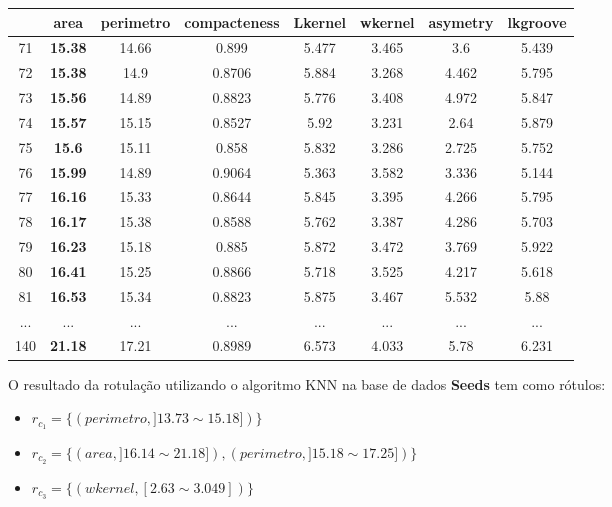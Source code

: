 \begin{table}[!ht]
{\begin{tabular}{|c|c|c|c|c|c|c|c|}
& \textbf{area} & \textbf{perimetro} & compacteness & Lkernel & wkernel & asymetry &lkgroove \\ \hline
\rowcolor[HTML]{EFEFEF} 
71 & \textbf{15.38} & 14.66 & 0.899 & 5.477 & 3.465 & 3.6 & 5.439\\ \hline 
\rowcolor[HTML]{EFEFEF}
72 & \textbf{15.38} & 14.9 & 0.8706 & 5.884 & 3.268 & 4.462 & 5.795\\ \hline 
\rowcolor[HTML]{EFEFEF}
73 & \textbf{15.56} & 14.89 & 0.8823 & 5.776 & 3.408 & 4.972 & 5.847\\ \hline 
\rowcolor[HTML]{EFEFEF}
74 & \textbf{15.57} & 15.15 & 0.8527 & 5.92 & 3.231 & 2.64 & 5.879\\ \hline 
\rowcolor[HTML]{EFEFEF}
75 & \textbf{15.6} & 15.11 & 0.858 & 5.832 & 3.286 & 2.725 & 5.752\\ \hline 
\rowcolor[HTML]{EFEFEF}
76 & \textbf{15.99} & 14.89 & 0.9064 & 5.363 & 3.582 & 3.336 & 5.144\\ \hline 
77 & \textbf{16.16} & 15.33 & 0.8644 & 5.845 & 3.395 & 4.266 & 5.795\\ \hline 
78 & \textbf{16.17} & 15.38 & 0.8588 & 5.762 & 3.387 & 4.286 & 5.703\\ \hline 
\rowcolor[HTML]{EFEFEF}
79 & \textbf{16.23} & 15.18 & 0.885 & 5.872 & 3.472 & 3.769 & 5.922\\ \hline 
80 & \textbf{16.41} & 15.25 & 0.8866 & 5.718 & 3.525 & 4.217 & 5.618\\ \hline 
81 & \textbf{16.53} & 15.34 & 0.8823 & 5.875 & 3.467 & 5.532 & 5.88\\ \hline 
...& ... & ... & ... & ... & ... & ... & ...\\ \hline 
140 & \textbf{21.18} & 17.21 & 0.8989 & 6.573 & 4.033 & 5.78 & 6.231\\ \hline 

\end{tabular}
    }
    
 \label{tab:analise:seeds:cluster2}
\end{table}

O resultado da rotulação utilizando o algoritmo KNN na base de dados \textbf{Seeds} tem como rótulos: 
\begin{itemize}[noitemsep]
 \item ${r_{c_1}=\{ (perimetro, ]13.73 \sim 15.18]) \} }$
 \item ${r_{c_2}=\{ (area, ]16.14 \sim 21.18]), (perimetro, ]15.18 \sim 17.25]) \} }$
 \item ${r_{c_3}=\{ (wkernel, [2.63 \sim 3.049]) \} }$
\end{itemize}



